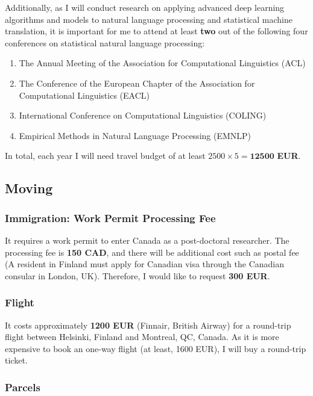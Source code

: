 \documentclass[11pt, oneside]{essay}
\begin{document}
Additionally, as I will conduct research on applying advanced
deep learning algorithms and models to natural language
processing and statistical machine translation, it is important
for me to attend at least \textbf{two} out of the following four
conferences on statistical natural language processing:
\begin{enumerate}
    \item The Annual Meeting of the Association for Computational Linguistics (ACL)
    \item The Conference of the European Chapter of the
    Association for Computational Linguistics (EACL)
    \item International Conference on Computational Linguistics (COLING)
    \item Empirical Methods in Natural Language Processing (EMNLP)
\end{enumerate}

In total, each year I will need travel budget of at least $2500
\times 5 = \mathbf{12500}$ \textbf{EUR}.

\subsection{Moving}

\subsubsection{Immigration: Work Permit Processing Fee}

It requires a work permit to enter Canada as a post-doctoral
researcher. The processing fee is \textbf{150 CAD}, and
there will be additional cost such as postal fee (A
resident in Finland must apply for Canadian visa through the
Canadian consular in London, UK). Therefore, I would like to
request \textbf{300 EUR}.

\subsubsection{Flight}

It costs approximately \textbf{1200 EUR} (Finnair, British
Airway) for a round-trip flight between Helsinki, Finland
and Montreal, QC, Canada. As it is more expensive to book an
one-way flight (at least, 1600 EUR), I will buy a round-trip
ticket. 

\subsubsection{Parcels}
\end{document}
